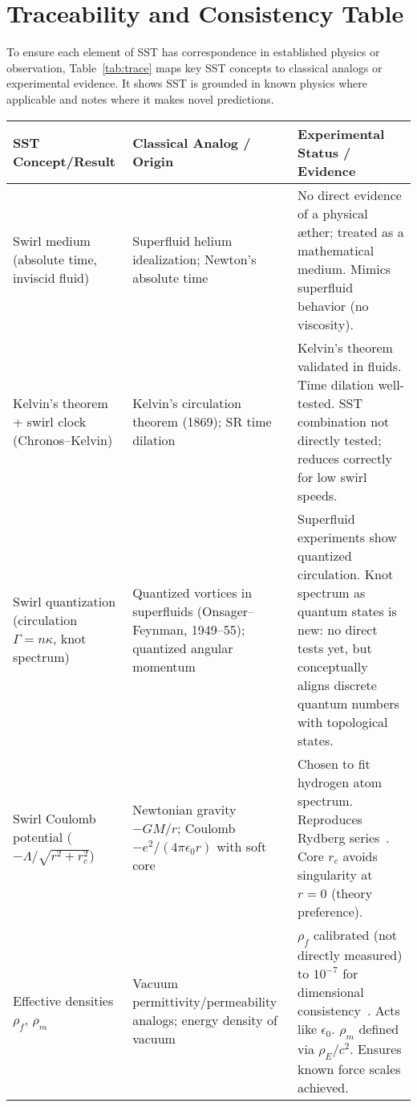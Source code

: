 \documentclass[aps,onecolumn,10pt,nofootinbib]{revtex4}
\begin{document}
	\section{Traceability and Consistency Table}
	To ensure each element of SST has correspondence in established physics or observation, Table~\ref{tab:trace} maps key SST concepts to classical analogs or experimental evidence. It shows SST is grounded in known physics where applicable and notes where it makes novel predictions.

	\begin{table*}[hbt!]
		\caption{Traceability of SST concepts/results to classical physics and experiments.}
		\label{tab:trace}
		\begin{ruledtabular}
			\begin{tabular}{p{4.2cm} p{5.3cm} p{5.3cm}}
				\textbf{SST Concept/Result} & \textbf{Classical Analog / Origin} & \textbf{Experimental Status / Evidence} \\
				\hline
				Swirl medium (absolute time, inviscid fluid) & Superfluid helium idealization; Newton’s absolute time & No direct evidence of a physical æther; treated as a mathematical medium. Mimics superfluid behavior (no viscosity). \\
				Kelvin’s theorem + swirl clock (Chronos–Kelvin) & Kelvin’s circulation theorem (1869); SR time dilation & Kelvin’s theorem validated in fluids. Time dilation well-tested. SST combination not directly tested; reduces correctly for low swirl speeds. \\
				Swirl quantization (circulation $\Gamma = n\kappa$, knot spectrum) & Quantized vortices in superfluids (Onsager–Feynman, 1949–55); quantized angular momentum & Superfluid experiments show quantized circulation. Knot spectrum as quantum states is new: no direct tests yet, but conceptually aligns discrete quantum numbers with topological states. \\
				Swirl Coulomb potential ($-\Lambda/\sqrt{r^2+r_c^2}$) & Newtonian gravity $-GM/r$; Coulomb $-e^2/(4\pi\epsilon_0 r)$ with soft core & Chosen to fit hydrogen atom spectrum. Reproduces Rydberg series~\cite{index120}. Core $r_c$ avoids singularity at $r=0$ (theory preference). \\
				Effective densities $\rho_f$, $\rho_m$ & Vacuum permittivity/permeability analogs; energy density of vacuum & $\rho_f$ calibrated (not directly measured) to $10^{-7}$ for dimensional consistency~\cite{index121}. Acts like $\epsilon_0$. $\rho_m$ defined via $\rho_E/c^2$. Ensures known force scales achieved. \\

\end{tabular}
\end{ruledtabular}
\end{table*}
\end{document}
